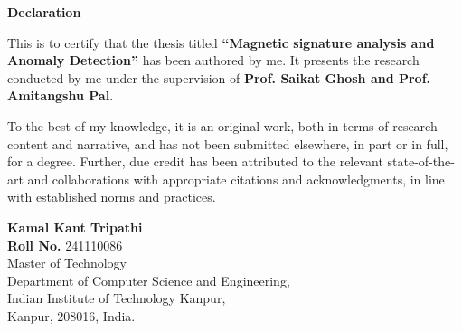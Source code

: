 \documentclass[12pt, a4paper, twoside, openright]{Thesis} %
\newcommand\myemptypage{
    \null
    \thispagestyle{empty}
    \addtocounter{page}{-1}
    \newpage
    }
\begin{document}
\begin{center}
    \LARGE \textbf{Declaration}
\end{center}
\vspace{1em}

This is to certify that the thesis titled \textbf{“Magnetic signature analysis and Anomaly Detection”} has been authored by me.
It presents the research conducted by me under the supervision of \textbf{Prof. Saikat Ghosh and Prof. Amitangshu Pal}.\par

To the best of my knowledge, it is an original work, both in terms of research content and narrative, and has not been submitted elsewhere, in part or in full, for a degree.
Further, due credit has been attributed to the relevant state-of-the-art and collaborations with appropriate citations and acknowledgments, in line with established norms and practices.
\bigskip
\bigskip
\bigskip
\bigskip

\begin{flushright}
   \vspace{2mm}
\textbf{Kamal Kant Tripathi} \\
\textbf{Roll No.} 241110086 \\
Master of Technology\\ 
Department of Computer Science and Engineering, \\
Indian Institute of Technology Kanpur,\\
Kanpur, 208016, India.
\end{flushright}

\newpage
\myemptypage
\end{document}
